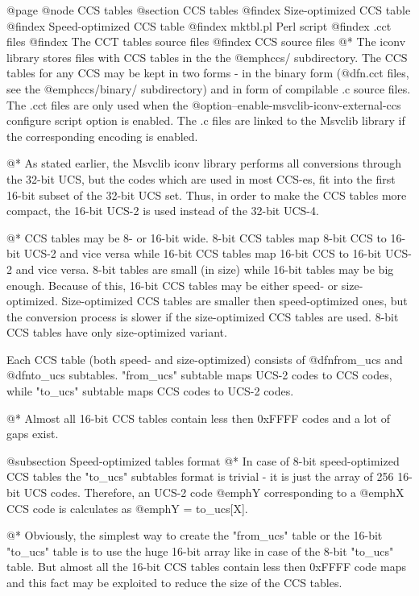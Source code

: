 @page
@node CCS tables
@section CCS tables
@findex Size-optimized CCS table
@findex Speed-optimized CCS table
@findex mktbl.pl Perl script
@findex .cct files
@findex The CCT tables source files
@findex CCS source files
@*
The iconv library stores files with CCS tables in the the @emph{ccs/}
subdirectory. The CCS tables for any CCS may be kept in two forms - in the binary form
(@dfn{.cct files}, see the @emph{ccs/binary/} subdirectory) and in form
of compilable .c source files. The .cct files are only used when the
@option{--enable-msvclib-iconv-external-ccs} configure script option is enabled.
The .c files are linked to the Msvclib library if the corresponding
encoding is enabled.

@*
As stated earlier, the Msvclib iconv library performs all
conversions through the 32-bit UCS, but the codes which are used
in most CCS-es, fit into the first 16-bit subset of the 32-bit UCS set.
Thus, in order to make the CCS tables more compact, the 16-bit UCS-2 is
used instead of the 32-bit UCS-4.

@*
CCS tables may be 8- or 16-bit wide. 8-bit CCS tables map 8-bit CCS to
16-bit UCS-2 and vice versa while 16-bit CCS tables map
16-bit CCS to 16-bit UCS-2 and vice versa.
8-bit tables are small (in size) while 16-bit tables may be big enough.
Because of this, 16-bit CCS tables may be
either speed- or size-optimized. Size-optimized CCS tables are
smaller then speed-optimized ones, but the conversion process is
slower if the size-optimized CCS tables are used. 8-bit CCS tables have only
size-optimized variant.

Each CCS table (both speed- and size-optimized) consists of
@dfn{from_ucs} and @dfn{to_ucs} subtables. "from_ucs" subtable maps
UCS-2 codes to CCS codes, while "to_ucs" subtable maps CCS codes to
UCS-2 codes.

@*
Almost all 16-bit CCS tables contain less then 0xFFFF codes and
a lot of gaps exist.

@subsection Speed-optimized tables format
@*
In case of 8-bit speed-optimized CCS tables the "to_ucs" subtables format is
trivial - it is just the array of 256 16-bit UCS codes. Therefore, an
UCS-2 code @emph{Y} corresponding to a @emph{X} CCS code is calculates
as @emph{Y = to_ucs[X]}.

@*
Obviously, the simplest way to create the "from_ucs" table or the
16-bit "to_ucs" table is to use the huge 16-bit array like in case
of the 8-bit "to_ucs" table. But almost all the 16-bit CCS tables contain
less then 0xFFFF code maps and this fact may be exploited to reduce
the size of the CCS tables.

